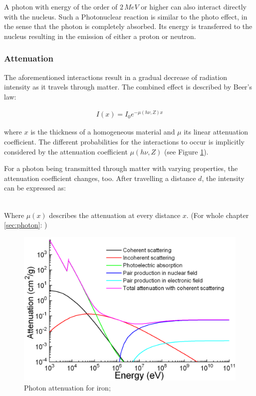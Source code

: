A photon with energy of the order of $2 \, MeV$ or higher can also interact directly with the nucleus.
Such a Photonuclear reaction is similar to the photo effect, in the sense that the photon is completely absorbed.
Its energy is transferred to the nucleus resulting in the emission of either a proton or neutron.

\subsubsection{Attenuation}
The aforementioned interactions result in a gradual decrease of radiation intensity as it travels through matter.
The combined effect is described by Beer's law:

\begin{align}
I(x) = I_0 e^{-\mu(h\nu,Z)x}
\end{align}

where $x$ is the thickness of a homogeneous material and $\mu$ its linear attenuation coefficient.
The different probabilities for the interactions to occur is implicitly considered by the attenuation coefficient $\mu(h\nu,Z)$ (see Figure \ref{fig:attenuation_iron}).

For a photon being transmitted through matter with varying properties, the attenuation coefficient changes, too.
After travelling a distance $d$, the intensity can be expressed as:

\begin{align}
\label{eq:mu_int}
\end{align}

Where $\mu(x)$ describes the attenuation at every distance $x$.
(For whole chapter \ref{sec:photon}: \cite{Podgorsak, Maidment2014})

\begin{figure}[h!]
	\centering
	\includegraphics[width=0.7\linewidth]{../fig/intro/Ironattenuation}
	\caption{Photon attenuation for iron; \cite{Materialscientist}}
	\label{fig:attenuation_iron}
\end{figure}

